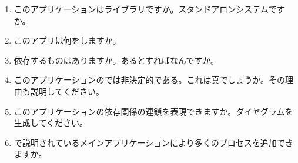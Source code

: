 \begin{enumerate}
  \item このアプリケーションはライブラリですか。スタンドアロンシステムですか。
  \item このアプリは何をしますか。  
  \item 依存するものはありますか。あるとすればなんですか。
  \item このアプリケーションのでは非決定的である。これは真でしょうか。その理由も説明してください。 
  \item このアプリケーションの依存関係の連鎖を表現できますか。ダイヤグラムを生成してください。
  \item {}で説明されているメインアプリケーションにより多くのプロセスを追加できますか。  
\end{enumerate}

